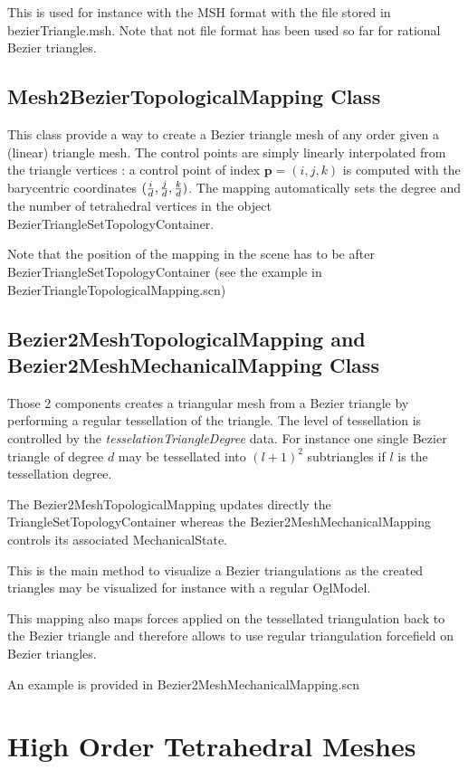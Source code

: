 \documentclass[a4paper,11pt]{article}
\begin{document}
This is used for instance with the MSH format with the file stored in bezierTriangle.msh. Note that not file format has been used so far for rational Bezier triangles. 

\subsection{Mesh2BezierTopologicalMapping Class}

This class provide a way to create a Bezier triangle mesh of any order given a (linear) triangle mesh. The control points are simply linearly interpolated from the triangle vertices : a control point of index ${\mathbf p}=(i,j,k)$ is computed with the barycentric coordinates $(\frac{i}{{d}},\frac{j}{{d}},\frac{k}{{d}})$. The mapping automatically sets the degree and the number of tetrahedral vertices in the object BezierTriangleSetTopologyContainer.

Note that the position of the mapping in the scene has to be after BezierTriangleSetTopologyContainer (see the example in BezierTriangleTopologicalMapping.scn) 

\subsection{Bezier2MeshTopologicalMapping and Bezier2MeshMechanicalMapping Class}

Those 2 components creates a triangular mesh from a Bezier triangle by performing a regular tessellation of the triangle. The level of tessellation is controlled by the {\em tesselationTriangleDegree } data.  For instance one single Bezier triangle of degree $d$ may be tessellated into $(l+1)^2$ subtriangles if $l$ is the tessellation degree. 

The Bezier2MeshTopologicalMapping updates directly the TriangleSetTopologyContainer whereas the Bezier2MeshMechanicalMapping controls its associated MechanicalState. 

This is the main method to visualize a Bezier triangulations as the created triangles may be visualized for instance with a regular OglModel. 

This mapping also maps forces applied on the tessellated triangulation back to the Bezier triangle and therefore allows to use regular triangulation forcefield on Bezier triangles.

An example is provided in Bezier2MeshMechanicalMapping.scn


\section{High Order Tetrahedral Meshes}
\end{document}
